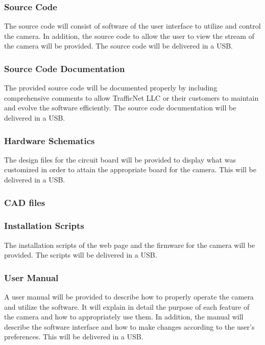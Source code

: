 \subsubsection{Source Code}
The source code will consist of software of the user interface to utilize and control the camera. In addition, the source code to allow the user to view the stream of the camera will be provided.  The source code will be delivered in a USB. 

\subsubsection{Source Code Documentation}
The provided source code will be documented properly by including comprehensive comments to allow TrafficNet LLC or their customers to maintain and evolve the software efficiently. The source code documentation will be delivered in a USB. 

\subsubsection{Hardware Schematics}
The design files for the circuit board will be provided to display what was customized in order to attain the appropriate board for the camera. This will be delivered in a USB.

\subsubsection{CAD files}


\subsubsection{Installation Scripts}
The installation scripts of the web page and the firmware for the camera will be provided. The scripts will be delivered in a USB. 

\subsubsection{User Manual}
A user manual will be provided to describe how to properly operate the camera and utilize the software. It will explain in detail the purpose of each feature of the camera and how to appropriately use them. In addition, the manual will describe the software interface and how to make changes according to the user’s preferences. This will be delivered in a USB. 


